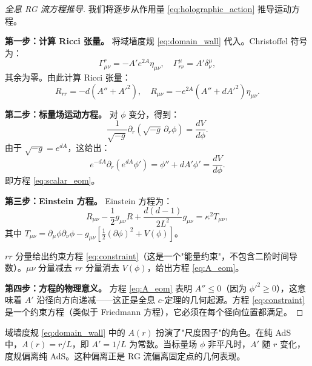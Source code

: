 \begin{proof}[全息 RG 流方程推导]
我们将逐步从作用量 \eqref{eq:holographic_action} 推导运动方程。

\textbf{第一步：计算 Ricci 张量。} 将域墙度规 \eqref{eq:domain_wall} 代入。Christoffel 符号为：
\begin{equation}
    \Gamma^r_{\mu\nu} = -A' e^{2A}\eta_{\mu\nu}, \quad \Gamma^\mu_{r\nu} = A'\delta^\mu_\nu,
\end{equation}
其余为零。由此计算 Ricci 张量：
\begin{equation}
    R_{rr} = -d(A'' + A'^2), \quad R_{\mu\nu} = -e^{2A}(A'' + dA'^2)\eta_{\mu\nu}.
\end{equation}

\textbf{第二步：标量场运动方程。} 对 $\phi$ 变分，得到：
\begin{equation}
    \frac{1}{\sqrt{-g}}\partial_r(\sqrt{-g}\,\partial_r\phi) = \frac{dV}{d\phi}.
\end{equation}
由于 $\sqrt{-g} = e^{dA}$，这给出：
\begin{equation}
    e^{-dA}\partial_r(e^{dA}\phi') = \phi'' + dA'\phi' = \frac{dV}{d\phi}.
\end{equation}
即方程 \eqref{eq:scalar_eom}。

\textbf{第三步：Einstein 方程。} Einstein 方程为：
\begin{equation}
    R_{\mu\nu} - \frac{1}{2}g_{\mu\nu}R + \frac{d(d-1)}{2L^2}g_{\mu\nu} = \kappa^2 T_{\mu\nu},
\end{equation}
其中 $T_{\mu\nu} = \partial_\mu\phi\partial_\nu\phi - g_{\mu\nu}\left[\frac{1}{2}(\partial\phi)^2 + V(\phi)\right]$。

$rr$ 分量给出约束方程 \eqref{eq:constraint}（这是一个"能量约束"，不包含二阶时间导数）。$\mu\nu$ 分量减去 $rr$ 分量消去 $V(\phi)$，给出方程 \eqref{eq:A_eom}。

\textbf{第四步：方程的物理意义。} 方程 \eqref{eq:A_eom} 表明 $A'' \leq 0$（因为 $\phi'^2 \geq 0$），这意味着 $A'$ 沿径向方向递减——这正是全息 $c$-定理的几何起源。方程 \eqref{eq:constraint} 是一个约束方程（类似于 Friedmann 方程），它必须在每个径向位置都满足。
\end{proof}

\begin{remark}
域墙度规 \eqref{eq:domain_wall} 中的 $A(r)$ 扮演了"尺度因子"的角色。在纯 AdS 中，$A(r) = r/L$，即 $A' = 1/L$ 为常数。当标量场 $\phi$ 非平凡时，$A'$ 随 $r$ 变化，度规偏离纯 AdS。这种偏离正是 RG 流偏离固定点的几何表现。
\end{remark}

